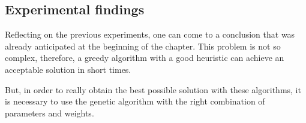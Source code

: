 \subsection{Experimental findings}

Reflecting on the previous experiments, one can come to a conclusion that was already anticipated at the beginning of the chapter. This problem is not so complex, therefore, a greedy algorithm with a good heuristic can achieve an acceptable solution in short times.

But, in order to really obtain the best possible solution with these algorithms, it is necessary to use the genetic algorithm with the right combination of parameters and weights.


